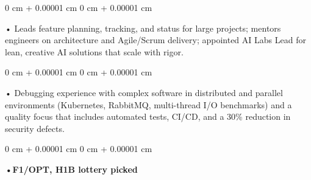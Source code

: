 \documentclass[10pt, letterpaper]{article}
\newenvironment{onecolentry}{
    \begin{adjustwidth}{
        0 cm + 0.00001 cm
    }{
        0 cm + 0.00001 cm
    }
}{
    \end{adjustwidth}
} %
\begin{document}
        \begin{onecolentry}
            • Leads feature planning, tracking, and status for large projects; mentors engineers on architecture and Agile/Scrum delivery; appointed AI Labs Lead for lean, creative AI solutions that scale with rigor.
        \end{onecolentry}
        \begin{onecolentry}
            • Debugging experience with complex software in distributed and parallel environments (Kubernetes, RabbitMQ, multi-thread I/O benchmarks) and a quality focus that includes automated tests, CI/CD, and a 30\% reduction in security defects.
        \end{onecolentry}
        \begin{onecolentry}
                \textbf{•F1/OPT, H1B lottery picked}
        \end{onecolentry}

    \vspace{2 pt }
\end{document}
